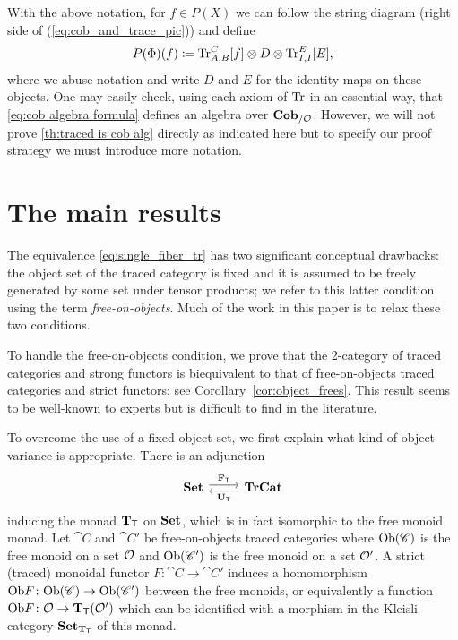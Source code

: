 \documentclass[11pt,oneside,article]{memoir}
\begin{document}
With the above notation, for $f\in P(X)$ we can follow the string diagram (right side of (\ref{eq:cob_and_trace_pic})) and define
\begin{equation}
      \label{eq:cob algebra formula}
   P(\Phi)(f)\coloneqq\operatorname{Tr}_{A,B}^C[f]\otimes D\otimes\operatorname{Tr}^E_{I,I}[E],
\end{equation}
where we abuse notation and write $D$ and $E$ for the identity maps on these objects.  One may easily check, using each axiom of $\operatorname{Tr}$ in an essential way, that \eqref{eq:cob algebra formula} defines an algebra over $\mathbf{Cob}_{/\mathcal{O}}$.  However, we will not prove \ref{th:traced is cob alg} directly as indicated here but to specify our proof strategy we must introduce more notation.


\section{The main results}
      \label{subsec:main_results}

The equivalence \eqref{eq:single_fiber_tr} has two significant conceptual drawbacks: the object set of the traced category is fixed and it is assumed to be freely generated by some set under tensor products; we refer to this latter condition using the term \emph{free-on-objects}. Much of the work in this paper is to relax these two conditions. 

To handle the free-on-objects condition, we prove that the 2-category of traced categories and strong functors is biequivalent to that of free-on-objects traced categories and strict functors; see Corollary~\ref{cor:object_frees}.  This result seems to be well-known to experts but is difficult to find in the literature.

To overcome the use of a fixed object set, we first explain what kind of object variance is appropriate.  There is an adjunction
\[\Adjoint{\Set}{\TrCat}{\FT}{\UT}\]
inducing the monad $\mathbf{T}_{\mathsf{T}}$ on $\mathbf{Set}$, which is in fact isomorphic to the free monoid monad.  Let $\cat{C}$ and $\cat{C}'$ be free-on-objects traced categories where $\mathrm{Ob}(\mathscr{C})$ is the free monoid on a set $\mathcal{O}$ and $\mathrm{Ob}(\mathscr{C}')$ is the free monoid on a set $\mathcal{O}'$. A strict (traced) monoidal functor $F\colon \cat{C}\to \cat{C}'$ induces a homomorphism $\mathrm{Ob} F\colon\mathrm{Ob}(\mathscr{C})\to\mathrm{Ob}(\mathscr{C}')$ between the free monoids, or equivalently a function $\mathrm{Ob} F\colon\mathcal{O}\to\mathbf{T}_{\mathsf{T}}(\mathcal{O}')$ which can be identified with a morphism in the Kleisli category $\mathbf{Set}_{\mathbf{T}_{\mathsf{T}}}$ of this monad.
\end{document}
